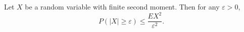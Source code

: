 Let $X$ be a random variable with finite second moment. Then for any $\varepsilon > 0$,
$$P(|X| \geq \varepsilon) \leq \frac{EX^2}{\varepsilon^2}.$$
